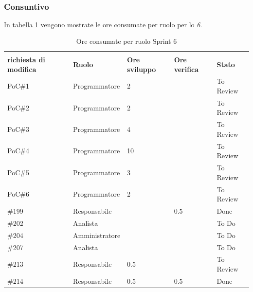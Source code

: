 \subsubsection{Consuntivo}
\hyperref[tab:sprint6_ore_consumate]{In tabella \ref{tab:sprint6_ore_consumate}} vengono mostrate le ore consumate per ruolo per lo \textit{ 6}.

\begin{table}[H]
    \centering
    \begin{tabular}{| l | l | l | l | l |}
        \hline
            \makecell{\textbf{Identificativo} \\ \textbf{richiesta di modifica}} &
            \textbf{Ruolo} & 
            \textbf{Ore sviluppo} &
            \textbf{Ore verifica} & 
            \textbf{Stato}\\ 
        \hline
        PoC\#1 & Programmatore & 2 &  & To Review\\
        \hline
        PoC\#2 & Programmatore & 2 &  & To Review\\
        \hline
        PoC\#3 & Programmatore & 4 &  & To Review\\
        \hline
        PoC\#4 & Programmatore & 10 &  & To Review\\
        \hline
        PoC\#5 & Programmatore & 3 &  & To Review\\
        \hline
        PoC\#6 & Programmatore & 2 &  & To Review\\
        \hline
        \#199 & Responsabile &  & 0.5 & Done\\
        \hline
        \#202 & Analista &  &  & To Do\\
        \hline
        \#204 & Amministratore &  &  & To Do\\
        \hline
        \#207 & Analista &  &  & To Do\\
        \hline
        \#213 & Responsabile & 0.5 &  & To Review\\
        \hline
        \#214 & Responsabile & 0.5 & 0.5 & Done\\
        \hline
    \end{tabular}
    \caption{Ore consumate per ruolo Sprint 6}
    \label{tab:sprint6_ore_consumate} 
\end{table}
